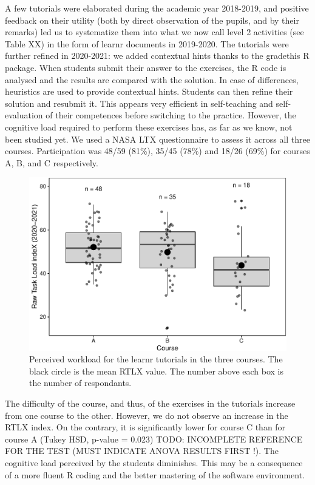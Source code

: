 \documentclass[
]{article}
\begin{document}
A few tutorials were elaborated during the academic year 2018-2019, and
positive feedback on their utility (both by direct observation of the
pupils, and by their remarks) led us to systematize them into what we
now call level 2 activities (see Table XX) in the form of learnr
documents in 2019-2020. The tutorials were further refined in 2020-2021:
we added contextual hints thanks to the gradethis R package. When
students submit their answer to the exercises, the R code is analysed
and the results are compared with the solution. In case of differences,
heuristics are used to provide contextual hints. Students can then
refine their solution and resubmit it. This appears very efficient in
self-teaching and self-evaluation of their competences before switching
to the practice. However, the cognitive load required to perform these
exercises has, as far as we know, not been studied yet. We used a NASA
LTX questionnaire to assess it across all three courses. Participation
was 48/59 (81\%), 35/45 (78\%) and 18/26 (69\%) for courses A, B, and C
respectively.

\begin{figure}
\centering
\includegraphics{teaching_data_science_files/figure-latex/rtlx-1.pdf}
\caption{Perceived workload for the learnr tutorials in the three
courses. The black circle is the mean RTLX value. The number above each
box is the number of respondants.}
\end{figure}

The difficulty of the course, and thus, of the exercises in the
tutorials increase from one course to the other. However, we do not
observe an increase in the RTLX index. On the contrary, it is
significantly lower for course C than for course A (Tukey HSD, p-value =
0.023) TODO: INCOMPLETE REFERENCE FOR THE TEST (MUST INDICATE ANOVA
RESULTS FIRST !). The cognitive load perceived by the students
diminishes. This may be a consequence of a more fluent R coding and the
better mastering of the software environment.
\end{document}
